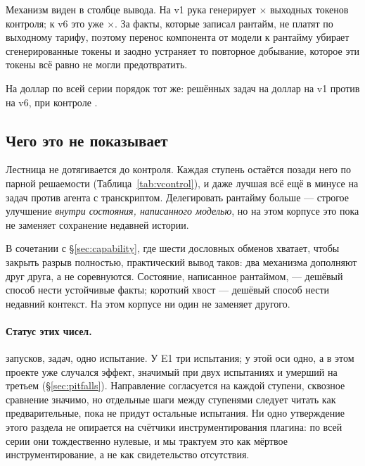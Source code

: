 Механизм виден в столбце вывода. На v1 рука генерирует \VOutVOne$\times$
выходных токенов контроля; к v6 это уже \VOutVSix$\times$. За факты, которые
записал рантайм, не платят по выходному тарифу, поэтому перенос компонента
от модели к рантайму убирает сгенерированные токены и заодно устраняет то
повторное добывание, которое эти токены всё равно не могли предотвратить.

На доллар по всей серии порядок тот же: \VCostPerVOne{} решённых задач на
доллар на v1 против \VCostPerVSix{} на v6, при контроле \VBaseCostPer.

\subsection{Чего это не показывает}

Лестница не дотягивается до контроля. Каждая ступень остаётся позади него по
парной решаемости (Таблица~\ref{tab:vcontrol}), и даже лучшая всё ещё в
минусе на \VCtlVSixNet{} задач против агента с транскриптом. Делегировать
рантайму больше — строгое улучшение \emph{внутри состояния, написанного
моделью}, но на этом корпусе это пока не заменяет сохранение недавней
истории.

В сочетании с \S\ref{sec:capability}, где шести дословных обменов хватает,
чтобы закрыть разрыв полностью, практический вывод таков: два механизма
дополняют друг друга, а не соревнуются. Состояние, написанное рантаймом, —
дешёвый способ нести устойчивые факты; короткий хвост — дешёвый способ нести
недавний контекст. На этом корпусе ни один не заменяет другого.

\begin{table}[t]
\centering
\caption{Каждая ступень в паре с контролем транскрипта внутри серии.}
\label{tab:vcontrol}

\end{table}

\paragraph{Статус этих чисел.} \VRuns{} запусков, \VTasks{} задач, одно
испытание. У E1 три испытания; у этой оси одно, а в этом проекте уже
случался эффект, значимый при двух испытаниях и умерший на третьем
(\S\ref{sec:pitfalls}). Направление согласуется на каждой ступени, сквозное
сравнение значимо, но отдельные шаги между ступенями следует читать как
предварительные, пока не придут остальные испытания. Ни одно утверждение
этого раздела не опирается на счётчики инструментирования плагина: по всей
серии они тождественно нулевые, и мы трактуем это как мёртвое
инструментирование, а не как свидетельство отсутствия\live.

